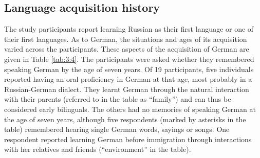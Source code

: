 \subsection{Language acquisition history}
The study participants report learning Russian as their first language or one of their first languages. As to German, the situations and ages of its acquisition varied across the participants. These aspects of the acquisition of German are given in Table \ref{tab:3:4}. The participants were asked whether they remembered speaking German by the age of seven years. Of 19 participants, five individuals reported having an oral proficiency in German at that age, most probably in a Russian-German dialect. They learnt German through the natural interaction with their parents (referred to in the table as 
“family”) and can thus be considered early bilinguals. The others had no memories of speaking German at the age of seven years, although five respondents (marked by asterisks in the table) remembered hearing single German words, sayings or songs. One respondent reported learning German before immigration through interactions with her relatives and friends (“environment” in the table).

